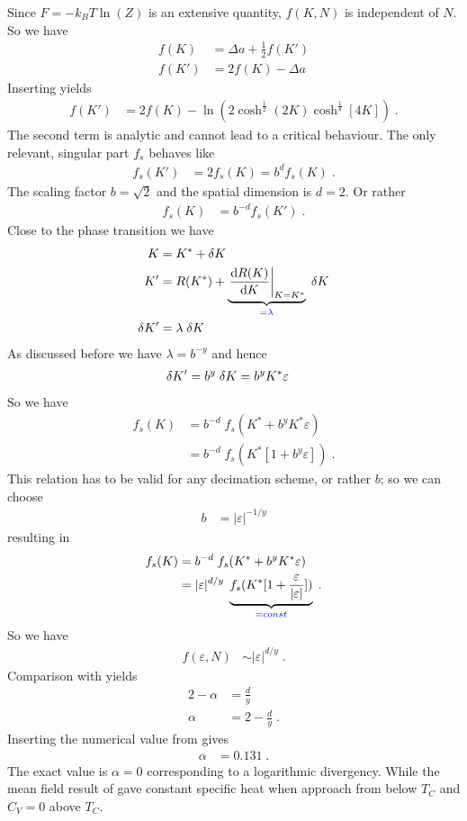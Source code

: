 % 
Since $F=-k_{B} T \ln(Z)$  is an extensive quantity, $f(K,N)$ is independent 
of $N$. So we have
%
\begin{align*}
f(K) &= \Delta a + \frac{1}{2} f(K')\\
f(K') &= 2 f(K) -\Delta a
\end{align*}
%
Inserting  yields
\begin{align}\label{a}
f(K') &= 2 f(K) -   \ln(2 \cosh^{\frac{1}{2}}(2K)\cosh^{\frac{1}{8}}[4 K]) \;.
\end{align}
The second term is analytic and cannot lead to a critical behaviour. The only relevant, singular part $f_{s}$ behaves like
%
\begin{align*}
f_{s}(K') &= 2 f_{s}(K) = b^{d} f_{s}(K)\;.
\end{align*}
%
The scaling factor $b=\sqrt{2}$ and the spatial dimension is $d=2$. Or rather
%
\begin{align*}
f_{s}(K) &= b^{-d} f_{s}(K')\;.
\end{align*}
%
Close to the phase transition we have 
%
\begin{align*}
K &= K^{*} +\var K\\
K' &=  R(K^{*}) +\underbrace{
 \eval{\dv{R(K)}{K}}_{K=K^{*}}
}_{\color{blue} = \lambda}\;\var K\\
\var K' &= \lambda \;\var K
\end{align*}
%
As discussed before we have $\lambda=b^{-y}$ and hence
%
\begin{align*}
\var K' &= b^{y} \;\var K = b^{y} K^{*} \varepsilon
\end{align*}
%
So we have
%
\begin{align*}
f_{s}(K) &= b^{-d}\;f_{s}(K^{*} + b^{y} K^{*} \varepsilon)\\
 &= b^{-d}\;f_{s}(K^{*}[1 + b^{y}  \varepsilon])\;.
\end{align*}
%
This relation has to be valid for any decimation scheme, or rather $b$; so we can choose
%
\begin{align*}
b &= |\varepsilon|^{-1/y}
\end{align*}
%
resulting in 
%
\begin{align*}
f_{s}(K) &= b^{-d}\;f_{s}(K^{*} + b^{y} K^{*} \varepsilon)\\
 &= |\varepsilon|^{d/y}\;\underbrace{
f_{s}(K^{*}[1 +  \frac{\varepsilon}{|\varepsilon|}])
}_{\color{blue} = const}\;.
\end{align*}
%
So we have
%
\begin{align*}
f(\varepsilon,N)&\sim  |\varepsilon|^{d/y}\;.
\end{align*}
%
Comparison with  yields
%
\begin{align*}
2 - \alpha &= \frac{d}{y}\\
\alpha &= 2 - \frac{d}{y}\;.
\end{align*}
%
Inserting the numerical value from \eq{} gives
%
\begin{align*}
\alpha &= 0.131\;.
\end{align*}
%
The exact value is $\alpha=0$ corresponding  to a logarithmic divergency.
While the mean field result of  gave constant specific heat 
when approach from below $T_{C}$ and $C_{V}=0$ above $T_{C}$.





